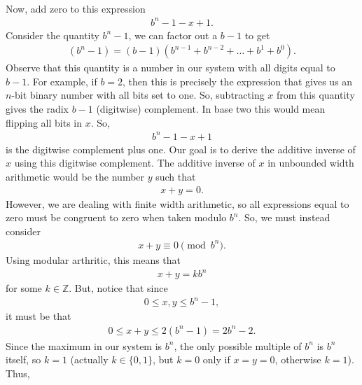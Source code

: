 \documentclass{report}
\begin{document}
\begin{itemize}
\begin{align*}
            \end{align*}
            Now, add zero to this expression
            \begin{align*}
                b^{n}-1-x+1
            .\end{align*}
            Consider the quantity $b^{n}-1$, we can factor out a $b-1$ to get
            \begin{align*}
                (b^{n}-1) = (b-1)(b^{n-1} + b^{n-2} + \dots + b^{1} + b^{0})
            .\end{align*}
            Observe that this quantity is a number in our system with all digits equal to $b-1$. For example, if $b=2$, then this is precisely the expression that gives us an $n$-bit binary number with all bits set to one. 
            \bigbreak \noindent 
            So, subtracting $x$ from this quantity gives the radix $b-1$ (digitwise) complement. In base two this would mean flipping all bits in $x$. So,
            \begin{align*}
                b^{n}-1-x+1
            \end{align*}
            is the digitwise complement plus one. Our goal is to derive the additive inverse of $x$ using this digitwise complement. The additive inverse of $x$ in unbounded width arithmetic would be the number $y$ such that
            \begin{align*}
                x+y = 0
            .\end{align*}
            However, we are dealing with finite width arithmetic, so all expressions equal to zero must be congruent to zero when taken modulo $b^{n}$. So, we must instead consider
            \begin{align*}
                x+y \equiv 0 \pmod{b^{n}}
            .\end{align*}
            Using modular arthritic, this means that
            \begin{align*}
                x+y = kb^{n}
            \end{align*}
            for some $k\in \mathbb{Z}$. But, notice that since
            \begin{align*}
                0 \leq x,y \leq b^{n}-1
            ,\end{align*}
            it must be that
            \begin{align*}
                0 \leq x + y \leq 2(b^{n} - 1) = 2b^{n}-2
            .\end{align*}
            Since the maximum in our system is $b^{n}$, the only possible multiple of $b^{n}$ is $b^{n}$ itself, so $k=1$ (actually $k\in \{0,1\}$, but $k=0$ only if $x=y=0$, otherwise $k=1$). Thus,

\end{itemize}
\end{document}
